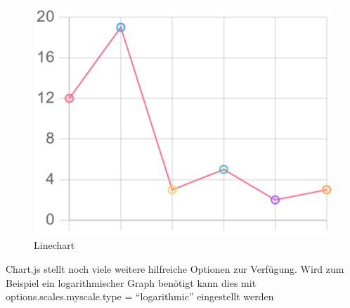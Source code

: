 \begin{figure}[H]
  \centering
  \includegraphics[scale=0.3]{pics/lineChart.png}
  \caption{Linechart}
  \label{fig:tech:linechart}
\end{figure}

Chart.js stellt noch viele weitere hilfreiche Optionen zur Verfügung. Wird
zum Beispiel ein logarithmischer Graph benötigt kann dies mit options.scales.myscale.type = ``logarithmic'' eingestellt werden

